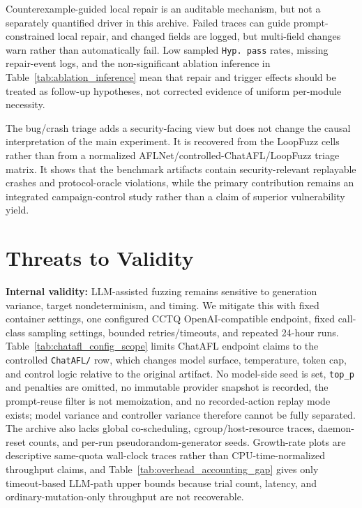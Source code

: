 \documentclass[final,5p,times,number]{elsarticle}
\begin{document}
Counterexample-guided local repair is an auditable mechanism, but not a separately quantified driver in this archive. Failed traces can guide prompt-constrained local repair, and changed fields are logged, but multi-field changes warn rather than automatically fail. Low sampled \texttt{Hyp. pass} rates, missing repair-event logs, and the non-significant ablation inference in Table~\ref{tab:ablation_inference} mean that repair and trigger effects should be treated as follow-up hypotheses, not corrected evidence of uniform per-module necessity.

The bug/crash triage adds a security-facing view but does not change the causal interpretation of the main experiment. It is recovered from the LoopFuzz cells rather than from a normalized AFLNet/controlled-ChatAFL/LoopFuzz triage matrix. It shows that the benchmark artifacts contain security-relevant replayable crashes and protocol-oracle violations, while the primary contribution remains an integrated campaign-control study rather than a claim of superior vulnerability yield.

\section{Threats to Validity}
\label{sec:threats}

\textbf{Internal validity:} LLM-assisted fuzzing remains sensitive to generation variance, target nondeterminism, and timing. We mitigate this with fixed container settings, one configured CCTQ OpenAI-compatible endpoint, fixed call-class sampling settings, bounded retries/timeouts, and repeated 24-hour runs. Table~\ref{tab:chatafl_config_scope} limits ChatAFL endpoint claims to the controlled \texttt{ChatAFL/} row, which changes model surface, temperature, token cap, and control logic relative to the original artifact. No model-side seed is set, \texttt{top\_p} and penalties are omitted, no immutable provider snapshot is recorded, the prompt-reuse filter is not memoization, and no recorded-action replay mode exists; model variance and controller variance therefore cannot be fully separated. The archive also lacks global co-scheduling, cgroup/host-resource traces, daemon-reset counts, and per-run pseudorandom-generator seeds. Growth-rate plots are descriptive same-quota wall-clock traces rather than CPU-time-normalized throughput claims, and Table~\ref{tab:overhead_accounting_gap} gives only timeout-based LLM-path upper bounds because trial count, latency, and ordinary-mutation-only throughput are not recoverable.
\end{document}
